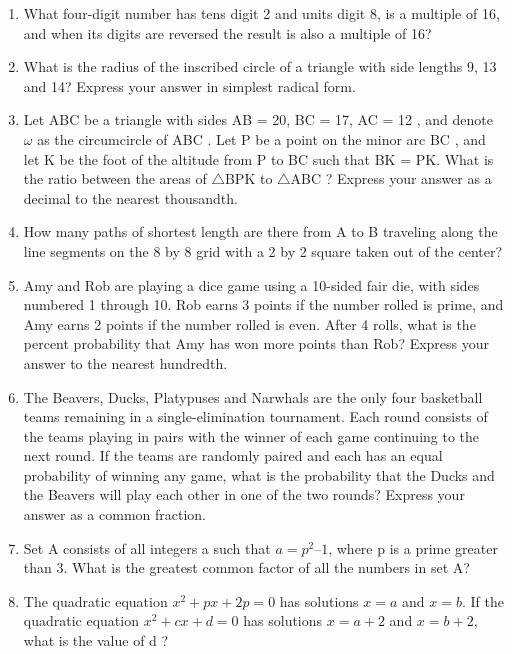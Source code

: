 \documentclass[12pt]{article}
\begin{document}
\begin{enumerate}
\item What four-digit number has tens digit 2 and units digit 8, is a multiple of 16, and
when its digits are reversed the result is also a multiple of 16?
\bigskip
\item What is the radius of the inscribed circle of a triangle with side lengths 9, 13 and
14? Express your answer in simplest radical form.
\bigskip
\item Let ABC be a triangle with sides AB = 20, BC = 17, AC = 12 ,
and denote $\omega$ as the circumcircle of ABC . Let P be a point on the minor arc BC ,
and let K
be the foot of the altitude from P to BC such that BK = PK.
What is the ratio between the areas of  $\triangle$BPK to $\triangle$ABC ?
Express your answer as a decimal to the nearest thousandth.
\bigskip
\item How many paths of shortest length are there from A to B traveling along the line segments
on the 8 by 8 grid with a 2 by 2 square taken out of the center?
\bigskip
\item Amy and Rob are playing a dice game using a 10-sided fair die, with sides numbered 1 through 10.
Rob earns 3 points if the number rolled is prime, and Amy earns 2 points if the number rolled is even.
After 4 rolls, what is the percent
probability that Amy has won more points than Rob? Express your answer to the nearest hundredth.
\bigskip
\item The Beavers, Ducks, Platypuses and Narwhals are the only four basketball
teams remaining in a single-elimination tournament. Each round consists of the
teams playing in pairs with the winner of each game continuing to the next
round. If the teams are randomly paired and each has an equal probability of
winning any game, what is the probability that the Ducks and the
Beavers will play each other in one of the two rounds? Express
your answer as a common fraction.
\bigskip
\item Set A consists of all integers a such that $a = p^2 – 1$, where p is a prime greater
than 3. What is the greatest common factor of all the numbers in set A?
\bigskip
\item The quadratic equation $x^2 + px + 2p = 0$ has solutions $x = a$ and $x = b$.
If the quadratic equation $x^2 + cx + d = 0$ has solutions $x = a + 2$ and $x = b + 2$,
what is the value of d ?

\end{enumerate}
\end{document}

